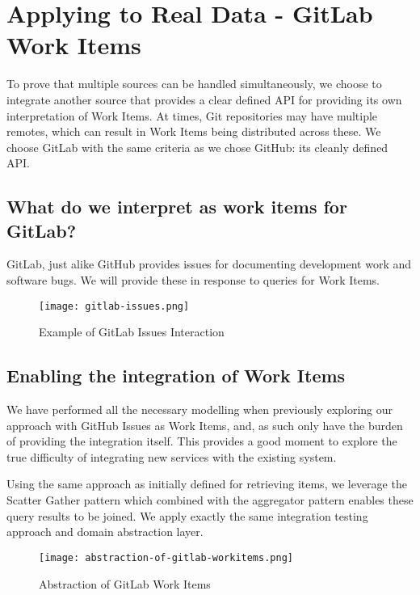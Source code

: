\section{Applying to Real Data - GitLab Work Items}

To prove that multiple sources can be handled simultaneously, we choose to integrate another source that provides a clear defined API for providing its own interpretation of Work Items. At times, Git repositories may have multiple remotes, which can result in Work Items being distributed across these. We choose GitLab with the same criteria as we chose GitHub: its cleanly defined API.


\subsection{What do we interpret as work items for GitLab?}

GitLab, just alike GitHub provides issues for documenting development work and software bugs. We will provide these in response to queries for Work Items.

\begin{figure}[h!]
	\centering
	\texttt{[image: gitlab-issues.png]}
	\label{fig:gitlabIssuesExample}
	\caption{Example of GitLab Issues Interaction}
\end{figure}

\subsection{Enabling the integration of Work Items}

We have performed all the necessary modelling when previously exploring our approach with GitHub Issues as Work Items, and, as such only have the burden of providing the integration itself. This provides a good moment to explore the true difficulty of integrating new services with the existing system.

Using the same approach as initially defined for retrieving items, we leverage the Scatter Gather pattern which combined with the aggregator pattern enables these query results to be joined. We apply exactly the same integration testing approach and domain abstraction layer.

\begin{figure}[h!]
	\centering
	\texttt{[image: abstraction-of-gitlab-workitems.png]}
	\caption{Abstraction of GitLab Work Items}
	\label{fig:abstractionOfGitLabWorkItems}
\end{figure}

